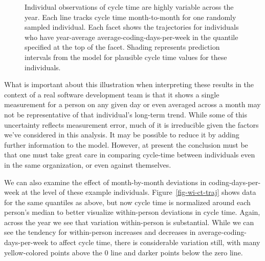 \documentclass[
  sn-mathphys-ay,
]{sn-jnl}
\begin{document}
\begin{figure}


\caption[Individual observations of cycle time are highly variable
across the year]{\label{fig-bw-ct-traj}Individual observations of cycle
time are highly variable across the year. Each line tracks cycle time
month-to-month for one randomly sampled individual. Each facet shows the
trajectories for individuals who have year-average
average-coding-days-per-week in the quantile specified at the top of the
facet. Shading represents prediction intervals from the model for
plausible cycle time values for these individuals.}

\end{figure}%

What is important about this illustration when interpreting these
results in the context of a real software development team is that it
shows a single measurement for a person on any given day or even
averaged across a month may not be representative of that individual's
long-term trend. While some of this uncertainty reflects measurement
error, much of it is irreducible given the factors we've considered in
this analysis. It may be possible to reduce it by adding further
information to the model. However, at present the conclusion must be
that one must take great care in comparing cycle-time between
individuals even in the same organization, or even against themselves.

We can also examine the effect of month-by-month deviations in
coding-days-per-week at the level of these example individuals.
Figure~\ref{fig-wi-ct-traj} shows data for the same quantiles as above,
but now cycle time is normalized around each person's median to better
visualize within-person deviations in cycle time. Again, across the year
we see that variation within-person is substantial. While we can see the
tendency for within-person increases and decreases in
average-coding-days-per-week to affect cycle time, there is considerable
variation still, with many yellow-colored points above the 0 line and
darker points below the zero line.
\end{document}
